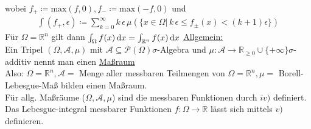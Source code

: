 wobei $f_+ \coloneqq \text{max}(f,0), f_-\coloneqq \text{max}(-f,0)$ und
\begin{align*}
    \int (f_+,\epsilon) \coloneqq \sum_{k=0}^\infty k\,\epsilon\,\mu (\{x\in\Omega |\,k\,\epsilon \leq f_{\pm}(x) < (k+1)\epsilon\})
\end{align*}
Für $\Omega=\mathbb{R}^n$ gilt dann $\int_{\Omega} f(x) \,\text{d}x = \int_{\mathbb{R}^n} f(x) \,\text{d}x$
\underline{Allgemein:}\\
Ein Tripel $(\Omega, \mathscr{A}, \mu)$ mit $\mathscr{A}\subseteq\mathscr{P}(\Omega) \sigma$-Algebra und $\mu\colon \mathscr{A}\to\mathbb{R}_{\geq 0} \cup \{+\infty\} \sigma$-additiv nennt man einen \underline{Maßraum}\\
Also: $\Omega = \mathbb{R}^n, \mathscr{A}=$ Menge aller messbaren Teilmengen von $\Omega=\mathbb{R}^n, \mu =$ Borell-Lebesgue-Maß bilden einen Maßraum.\\
Für allg. Maßräume ($\Omega, \mathscr{A},\mu$) sind die messbaren Funktionen durch $iv)$ definiert. Das Lebesgue-integral messbarer Funktionen $f\colon \Omega\to \mathbb{R}$ lässt sich mittels $v)$ definieren.\\

